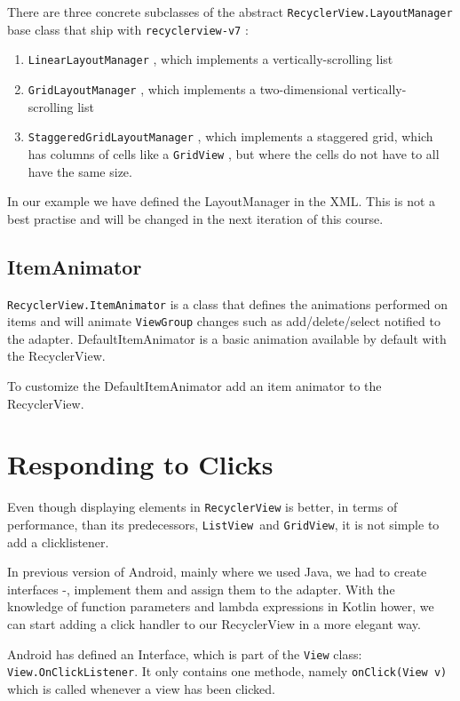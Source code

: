 There are three concrete subclasses of the abstract \lstinline!RecyclerView.LayoutManager!
base class that ship with \lstinline!recyclerview-v7! :
\begin{enumerate}
	\item \lstinline!LinearLayoutManager! , which implements a vertically-scrolling list
	\item \lstinline!GridLayoutManager! ,
	which implements a two-dimensional vertically-
	scrolling list
	\item \lstinline!StaggeredGridLayoutManager! , which implements a staggered grid, which
	has columns of cells like a \lstinline!GridView! , but where the cells do not have to all
	have the same size.
\end{enumerate}

In our example we have defined the LayoutManager in the XML. This is not a best practise and will be changed in the next iteration of this course. 

\subsection{ItemAnimator}
\lstinline!RecyclerView.ItemAnimator! is a class that defines the animations performed on items and will animate \lstinline!ViewGroup! changes such as add/delete/select notified to the adapter. DefaultItemAnimator is a basic animation available by default with the RecyclerView.

To customize the DefaultItemAnimator add an item animator to the RecyclerView. 


\section{Responding to Clicks}
Even though displaying elements in \lstinline|RecyclerView| is better, in terms of performance, than its predecessors,  \lstinline|ListView |and  \lstinline|GridView|, it is not simple to add a clicklistener. 

In previous version of Android, mainly where we used Java, we had to create interfaces -, implement them and assign them to the adapter. With the knowledge of function parameters and lambda expressions in Kotlin hower, we can start adding a click handler to our RecyclerView in a more elegant way.

Android has defined an Interface, which is part of the \lstinline|View|  class: \lstinline|View.OnClickListener|. It only contains one methode, namely \lstinline|onClick(View v)| which is called whenever a view has been clicked.

